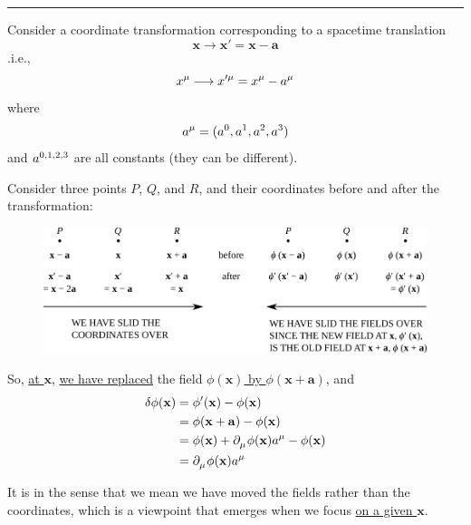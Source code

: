 \documentclass{article}
\begin{document}

\noindent\rule{\textwidth}{.5pt}

\noindent Consider a coordinate transformation corresponding to a spacetime translation
\begin{equation*}
    \mathbf{x} \longrightarrow \mathbf{x}' = \mathbf{x} - \mathbf{a}
\end{equation*}
.i.e.,
\begin{equation*}
    \tensor{x}{^\mu} \longrightarrow \tensor{x}{^\prime^\mu} = \tensor{x}{^\mu} - \tensor{a}{^\mu}
\end{equation*}
where
\begin{equation*}
    \tensor{a}{^\mu} = ( \tensor{a}{^0}, \tensor{a}{^1}, \tensor{a}{^2}, \tensor{a}{^3} )
\end{equation*}
and $\tensor{a}{^0^,^1^,^2^,^3}$ are all constants (they can be different).

\noindent Consider three points $P$, $Q$, and $R$, and their coordinates before and after the transformation:

\begin{figure}[h!]
    \centering
    \includegraphics[width=\textwidth]{pics/07-coordinate-transformation.pdf}
    \label{fig:l7-coordinate-transformation}
\end{figure}

So, \underline{at $\mathbf{x}$}, \underline{we have replaced} the field \underline{$\phi (\mathbf{x})$ by $\phi ( \mathbf{x} + \mathbf{a} )$}, and
\begin{align*}
    \delta \phi (\mathbf{x}) &= \phi' (\mathbf{x}) - \phi (\mathbf{x}) \\
    &= \phi ( \mathbf{x} + \mathbf{a} ) - \phi (\mathbf{x}) \\
    &= \phi (\mathbf{x}) + \tensor{\partial}{_\mu} \phi (\mathbf{x}) \tensor{a}{^\mu} - \phi (\mathbf{x}) \\
    &= \tensor{\partial}{_\mu} \phi (\mathbf{x}) \tensor{a}{^\mu}
\end{align*}

\noindent It is in the sense that we mean we have moved the fields rather than the coordinates, which is a viewpoint that emerges when we focus \underline{on a given $\mathbf{x}$}.
\end{document}
